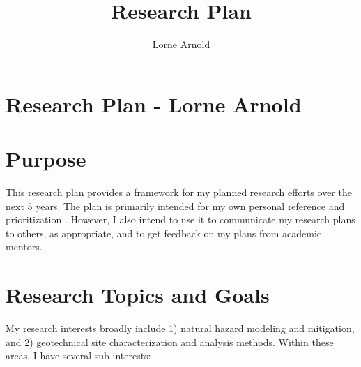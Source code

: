 \documentclass[10pt,letterpaper]{article}
\author{Lorne Arnold}
\title{Research Plan}
\begin{document}
\section*{Research Plan - Lorne Arnold}
\section{Purpose}
This research plan provides a framework for my planned research efforts over the next 5 years.
The plan is primarily intended for my own personal reference and prioritization .
However, I also intend to use it to communicate my research plans to others, as appropriate, and to get feedback on my plans from academic mentors.

\section{Research Topics and Goals}

My research interests broadly include 1) natural hazard modeling and mitigation, and 2) geotechnical site characterization and analysis methods.
Within these areas, I have several sub-interests:
\end{document}
